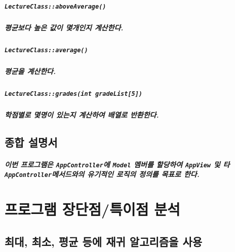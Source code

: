\documentclass[UTF8]{report}
\begin{document}
            \paragraph{\texttt{LectureClass::aboveAverage()}}
            \paragraph{%
                \normalfont 평균보다 높은 값이 몇개인지 계산한다.
            }

            \paragraph{\texttt{LectureClass::average()}}
            \paragraph{%
                \normalfont 평균을 계산한다.
            }

            \paragraph{\texttt{LectureClass::grades(int gradeList[5])}}
            \paragraph{%
                \normalfont 학점별로 몇명이 있는지 계산하여 배열로 반환한다.
            }

        \section{종합 설명서}

            \paragraph{%
                \normalfont 이번 프로그램은 \texttt{AppController}에 \texttt{Model} 멤버를 할당하여 \texttt{AppView} 및 타 \texttt{AppController}메서드와의 유기적인 로직의 정의를 목표로 한다. 
            }
            
    \chapter{프로그램 장단점/특이점 분석}
            \section{최대, 최소, 평균 등에 재귀 알고리즘을 사용}
\end{document}
